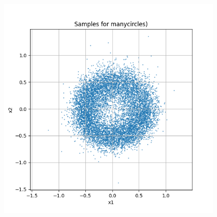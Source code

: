 \documentclass[a4paper,12pt]{article}
\begin{document}
\begin{figure}[H]
\begin{minipage}{0.3\textwidth}
  \end{minipage}
  \begin{minipage}{0.3\textwidth}
      \centering
      \includegraphics[width=\linewidth]{"images/Samples for ddpm_2_50_0.0001_0.02_manycircles.png"}
  \end{minipage}

  \vspace{0.5cm}


\end{figure}
\end{document}
